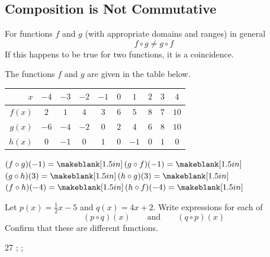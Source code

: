 \subsection{Composition is Not Commutative} 
\begin{fact}
For functions $f$ and $g$ (with appropriate domains and ranges) in general
$$f\circ g\neq g\circ f$$
If this happens to be true for two functions, it is a coincidence.
\end{fact}
\begin{Example}The functions $f$ and $g$ are given in the table below.
\begin{center}
\begin{tabularx}{\linewidth}{|R|C|C|C|C|C|C|C|C|C|}
\hline
$x$&$-4$&$-3$&$-2$&$-1$&$0$&$1$&$2$&$3$&$4$\\\hline
$f(x)$&$2$&$1$&$4$&$3$&$6$&$5$&$8$&$7$&$10$\\\hline
$g(x)$&$-6$&$-4$&$-2$&$0$&$2$&$4$&$6$&$8$&$10$\\\hline
$h(x)$&$0$&$-1$&$0$&$1$&$0$&$-1$&$0$&$1$&$0$\\\hline
\end{tabularx}
\end{center}
$(f\circ g)(-1)=\makeblank[1.5in]$\hfill$(g\circ f)(-1)=\makeblank[1.5in]$\lbr
$(g\circ h)(3)=\makeblank[1.5in]$\hfill$(h\circ g)(3)=\makeblank[1.5in]$\lbr
$(f\circ h)(-4)=\makeblank[1.5in]$\hfill$(h\circ f)(-4)=\makeblank[1.5in]$
\end{Example}
\begin{Example}Let $p(x)=\frac{1}{2}x-5$ and $q(x)=4x+2$. Write expressions for each of
$$(p\circ q)(x) \qquad \mbox{and} \qquad (q\circ p)(x)$$
Confirm that these are different functions.
\begin{lpicvsplit}{2}{7}
;
;
\end{lpicvsplit}
\end{Example}